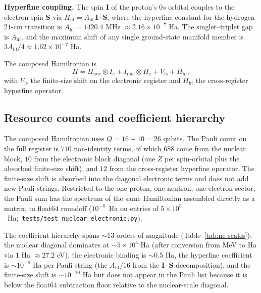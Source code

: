 \documentclass[twocolumn,prc,amsmath,amssymb,superscriptaddress]{revtex4-2}
\begin{document}
\textbf{Hyperfine coupling.} The spin $\mathbf{I}$ of the proton's $0s$
orbital couples to
the electron spin $\mathbf{S}$ via
$H_{\mathrm{hf}} = A_{\mathrm{hf}} \, \mathbf{I}\cdot\mathbf{S}$, where
the hyperfine constant for the hydrogen $21$-cm transition is
$A_{\mathrm{hf}} = 1420.4$ MHz $\approx 2.16 \times 10^{-7}$ Ha. The
singlet--triplet gap is $A_{\mathrm{hf}}$, and the maximum shift of
any single ground-state manifold member is $3 A_{\mathrm{hf}}/4
\approx 1.62 \times 10^{-7}$ Ha.

The composed Hamiltonian is
\begin{equation}
  H = H_{\mathrm{nuc}} \otimes I_{e}
    + I_{\mathrm{nuc}} \otimes H_{e}
    + V_{\mathrm{fs}} + H_{\mathrm{hf}},
\label{eq:composed-ne}
\end{equation}
with $V_{\mathrm{fs}}$ the finite-size shift on the electronic register
and $H_{\mathrm{hf}}$ the cross-register hyperfine operator.

\subsection{Resource counts and coefficient hierarchy}

The composed Hamiltonian uses $Q = 16 + 10 = 26$ qubits. The Pauli
count on the full register is $710$ non-identity terms, of which
$688$ come from the nuclear block, $10$ from the electronic block
diagonal (one $Z$ per spin-orbital plus the absorbed finite-size
shift), and $12$ from the cross-register hyperfine operator. The
finite-size shift is absorbed into the diagonal electronic terms and
does not add new Pauli strings. Restricted to the one-proton,
one-neutron, one-electron sector, the Pauli sum has the spectrum of
the same Hamiltonian assembled directly as a matrix, to float$64$
roundoff ($10^{-8}$~Ha on entries of $5\times 10^5$~Ha;\
\texttt{tests/test\_nuclear\_electronic.py}).

The coefficient hierarchy spans $\sim 13$ orders of magnitude
(Table~\ref{tab:ne-scales}): the nuclear diagonal dominates at
$\sim 5 \times 10^5$ Ha (after conversion from MeV to
Ha via $1$ Ha $\approx 27.2$ eV), the electronic binding is $\sim 0.5$ Ha,
the hyperfine coefficient is $\sim 10^{-8}$ Ha per Pauli string (the
$A_{\mathrm{hf}}/16$ from the $\mathbf{I}\cdot\mathbf{S}$ decomposition),
and the finite-size shift is $\sim 10^{-10}$ Ha but does not appear in
the Pauli list because it is below the float$64$ subtraction floor
relative to the nuclear-scale diagonal.
\end{document}
